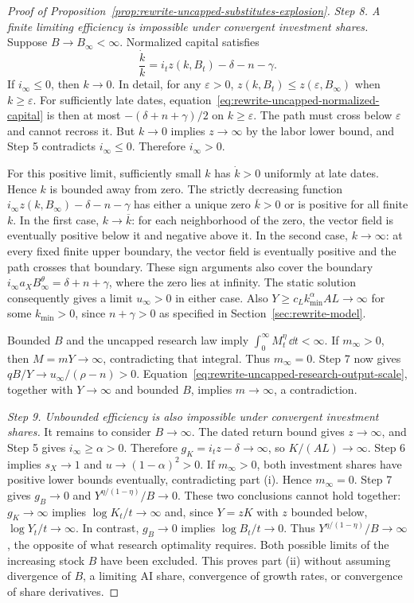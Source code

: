 \begin{proof}[Proof of Proposition~\ref{prop:rewrite-uncapped-substitutes-explosion}]
\textit{Step 8. A finite limiting efficiency is impossible under convergent investment shares.}
Suppose $B\to B_\infty<\infty$. Normalized capital satisfies
\begin{equation}
 \frac{\dot k}{k}=i_tz(k,B_t)-\delta-n-\gamma.
 \label{eq:rewrite-uncapped-normalized-capital}
\end{equation}
If $i_\infty\leq0$, then $k\to0$. In detail, for any $\varepsilon>0$,
$z(k,B_t)\leq z(\varepsilon,B_\infty)$ when $k\geq\varepsilon$.
For sufficiently late dates, equation~\eqref{eq:rewrite-uncapped-normalized-capital}
is then at most $-(\delta+n+\gamma)/2$ on $k\geq\varepsilon$.
The path must cross below $\varepsilon$ and cannot recross it.
But $k\to0$ implies $z\to\infty$ by the labor lower bound, and Step 5
contradicts $i_\infty\leq0$. Therefore $i_\infty>0$.

For this positive limit, sufficiently small $k$ has $\dot k>0$ uniformly
at late dates. Hence $k$ is bounded away from zero.
The strictly decreasing function
$i_\infty z(k,B_\infty)-\delta-n-\gamma$ has either a unique zero
$\overline k>0$ or is positive for all finite $k$.
In the first case, $k\to\overline k$: for each neighborhood of the zero,
the vector field is eventually positive below it and negative above it.
In the second case, $k\to\infty$: at every fixed finite upper boundary,
the vector field is eventually positive and the path crosses that boundary.
These sign arguments also cover the boundary
$i_\infty a_XB_\infty^\theta=\delta+n+\gamma$, where the zero lies at
infinity.
The static solution consequently gives a limit $u_\infty>0$ in either
case. Also $Y\geq c_L k_{\min}^\alpha AL\to\infty$ for some
$k_{\min}>0$, since $n+\gamma>0$ as specified in Section~\ref{sec:rewrite-model}.

Bounded $B$ and the uncapped research law imply
$\int_0^\infty M_t^\eta\,\dd t<\infty$.
If $m_\infty>0$, then $M=mY\to\infty$, contradicting that integral.
Thus $m_\infty=0$. Step 7 now gives $qB/Y\to u_\infty/(\rho-n)>0$.
Equation~\eqref{eq:rewrite-uncapped-research-output-scale}, together with
$Y\to\infty$ and bounded $B$, implies $m\to\infty$, a contradiction.

\textit{Step 9. Unbounded efficiency is also impossible under convergent investment shares.}
It remains to consider $B\to\infty$. The dated return bound gives
$z\to\infty$, and Step 5 gives $i_\infty\geq\alpha>0$.
Therefore $g_K=i_tz-\delta\to\infty$, so $K/(AL)\to\infty$.
Step 6 implies $s_X\to1$ and $u\to(1-\alpha)^2>0$.
If $m_\infty>0$, both investment shares have positive lower bounds
eventually, contradicting part (i). Hence $m_\infty=0$.
Step 7 gives $g_B\to0$ and
$Y^{\eta/(1-\eta)}/B\to0$.
These two conclusions cannot hold together:
$g_K\to\infty$ implies $\log K_t/t\to\infty$ and, since $Y=zK$ with
$z$ bounded below, $\log Y_t/t\to\infty$.
In contrast, $g_B\to0$ implies $\log B_t/t\to0$.
Thus $Y^{\eta/(1-\eta)}/B\to\infty$, the opposite of what research
optimality requires.
Both possible limits of the increasing stock $B$ have been excluded.
This proves part (ii) without assuming divergence of $B$, a limiting
AI share, convergence of growth rates, or convergence of share derivatives.
\end{proof}
